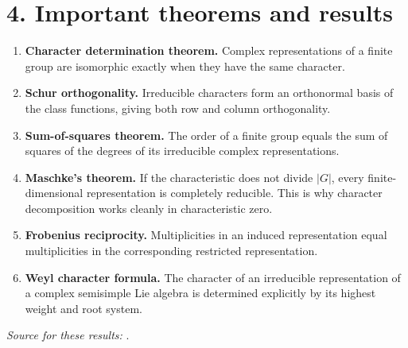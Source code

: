 \section*{4. Important theorems and results}
\begin{enumerate}[leftmargin=*,itemsep=0.35em]

\item \textbf{Character determination theorem.} Complex representations of a finite group are isomorphic exactly when they have the same character.

\item \textbf{Schur orthogonality.} Irreducible characters form an orthonormal basis of the class functions, giving both row and column orthogonality.

\item \textbf{Sum-of-squares theorem.} The order of a finite group equals the sum of squares of the degrees of its irreducible complex representations.

\item \textbf{Maschke's theorem.} If the characteristic does not divide $|G|$, every finite-dimensional representation is completely reducible. This is why character decomposition works cleanly in characteristic zero.

\item \textbf{Frobenius reciprocity.} Multiplicities in an induced representation equal multiplicities in the corresponding restricted representation.

\item \textbf{Weyl character formula.} The character of an irreducible representation of a complex semisimple Lie algebra is determined explicitly by its highest weight and root system.
\end{enumerate}
\noindent\emph{Source for these results:} \cite{character_theory_ref1}.

